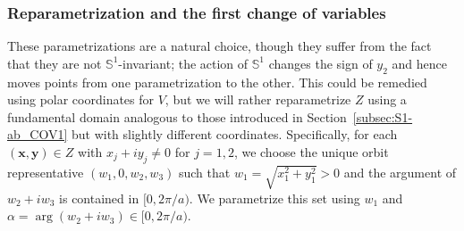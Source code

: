 \documentclass[twoside]{amsart}
\theoremstyle{definition}
\theoremstyle{remark}
\numberwithin{equation}{section}
\newcommand{\Sp}{\mathbb{S}}
\begin{document}

\subsubsection{Reparametrization and the first change of variables}
\label{subsubsec:S1-ab_SympCOV1}

These parametrizations are a natural choice, though they suffer from the fact that they are not $\Sp^1$-invariant; the action of $\Sp^1$ changes the
sign of $y_2$ and hence moves points from one parametrization to the other. This could be remedied using polar coordinates for $V$, but we will rather
reparametrize $Z$ using a fundamental domain analogous to those introduced in Section~\ref{subsec:S1-ab_COV1} but with slightly different coordinates.
Specifically, for each $(\mathbf{x}, \mathbf{y}) \in Z$ with $x_j + i y_j \neq 0$ for $j = 1,2$, we choose the unique orbit representative
$(w_1, 0, w_2, w_3)$ such that $w_1 = \sqrt{x_1^2 + y_1^2} > 0$ and the argument of $w_2 + i w_3$ is contained in $[0, 2\pi/a)$. We parametrize
this set using $w_1$ and $\alpha = \arg (w_2 + i w_3) \in [0, 2\pi/a)$.
\end{document}
